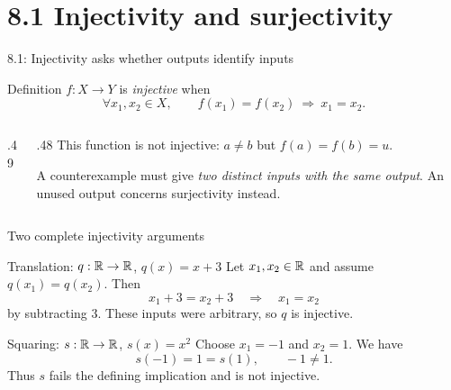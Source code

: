 \section{8.1 Injectivity and surjectivity}
\begin{frame}{8.1: Injectivity asks whether outputs identify inputs}
\begin{block}{Definition}
$f:X\to Y$ is \emph{injective} when
\[
  \forall x_1,x_2\in X,\qquad f(x_1)=f(x_2)\ \Longrightarrow\ x_1=x_2.
\]
\end{block}
\begin{columns}[T]
\begin{column}{.49\textwidth}
\centering
{}
\end{column}
\begin{column}{.48\textwidth}
This function is not injective: $a\ne b$ but $f(a)=f(b)=u$.
\medskip

A counterexample must give \emph{two distinct inputs with the same output}.
An unused output concerns surjectivity instead.
\end{column}
\end{columns}
\end{frame}

\begin{frame}{Two complete injectivity arguments}
\begin{exampleblock}{Translation: $q:\mathbb{R}\to\mathbb{R}$, $q(x)=x+3$}
Let $x_1,x_2\in\mathbb{R}$ and assume $q(x_1)=q(x_2)$. Then
\[
 x_1+3=x_2+3\quad\Longrightarrow\quad x_1=x_2
\]
by subtracting $3$. These inputs were arbitrary, so $q$ is injective.
\end{exampleblock}
\begin{exampleblock}{Squaring: $s:\mathbb{R}\to\mathbb{R}$, $s(x)=x^2$}
Choose $x_1=-1$ and $x_2=1$. We have
\[
 s(-1)=1=s(1),\qquad -1\ne 1.
\]
Thus $s$ fails the defining implication and is not injective.
\end{exampleblock}
\end{frame}

